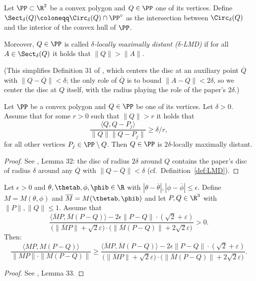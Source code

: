 \begin{definition}
  \label{def:LMD}
  \leanok
    Let $\PP \subset \R^2$ be a convex polygon and $Q \in \PP$ one of its vertices. Define $\Sect_\delta(Q) \coloneqq \Circ_{\delta}(Q) \cap \PP^\circ$ as the intersection between $\Circ_{\delta}(Q)$ and the interior of the convex hull of $\PP$.

    Moreover, $Q \in \PP$ is called \emph{$\delta$-locally maximally distant ($\delta$-LMD)} if for all $A \in \Sect_\delta(Q)$ it holds that $\|Q\| > \|A\|$.

    (This simplifies Definition 31 of \cite{polyhedron.without.rupert}, which centers the disc at an auxiliary point $\overline{Q}$ with $\|Q - \overline{Q}\| < \delta$; the only role of $\overline{Q}$ is to bound $\|A - Q\| < 2\delta$, so we center the disc at $Q$ itself, with the radius playing the role of the paper's $2\delta$.)
\end{definition}

\begin{lemma} \label{lem:LMD}
  \leanok
    Let $\PP$ be a convex polygon and $Q \in \PP$ be one of its vertices. Let $\delta > 0$. Assume that for some $r > 0 $ such that $\|Q\| > r$ it holds that
    \[
        \frac{\langle Q, Q - P_j \rangle}{\|Q\|\|Q - P_j\|} \geq \delta/r,
    \]
    for all other vertices $P_j \in \PP \setminus Q$. Then $Q \in \PP$ is $2\delta$-locally maximally distant.
\end{lemma}

\begin{proof}\leanok
See \cite{polyhedron.without.rupert}, Lemma 32: the disc of radius $2\delta$ around $Q$ contains the paper's disc of radius $\delta$ around any $\overline{Q}$ with $\|Q - \overline{Q}\| < \delta$ (cf.\ Definition~\ref{def:LMD}).
\end{proof}

\begin{lemma} \label{lem:coss}
  \leanok
  Let $\epsilon>0$ and $\theta,\thetab, \phi, \phib \in \R$ with $|\theta - \overline{\theta}|, |\phi - \overline{\phi}| \leq \epsilon$. Define $M = M(\theta, \phi)$ and $\overline{M} = M(\thetab, \phib)$ and let $P, Q \in \R^3$ with $\|P\|, \|Q\| \leq 1$. Assume that
    \[
        \frac{\langle \overline{M} P,\overline{M} (P-Q)\rangle - 2 \epsilon \|P-Q\| \cdot  (\sqrt{2}+\varepsilon)}{ \big(\|\overline{M} P\|+\sqrt{2} \varepsilon \big) \cdot \big(\|\overline{M}(P-Q)\|+2 \sqrt{2} \varepsilon\big)} > 0.
    \]
  Then:
    \[
        \frac{\langle {M} P,{M} (P-Q)\rangle}{\|{M} P\| \cdot \|{M}(P-Q)\|} \geq
        \frac{\langle \overline{M} P,\overline{M} (P-Q)\rangle - 2 \epsilon \|P-Q\| \cdot  (\sqrt{2}+\varepsilon)}{ \big(\|\overline{M} P\|+\sqrt{2} \varepsilon \big) \cdot \big(\|\overline{M}(P-Q)\|+2 \sqrt{2} \varepsilon\big)}.
    \]
\end{lemma}
\begin{proof}
\leanok
See \cite{polyhedron.without.rupert}, Lemma 33.
\end{proof}

